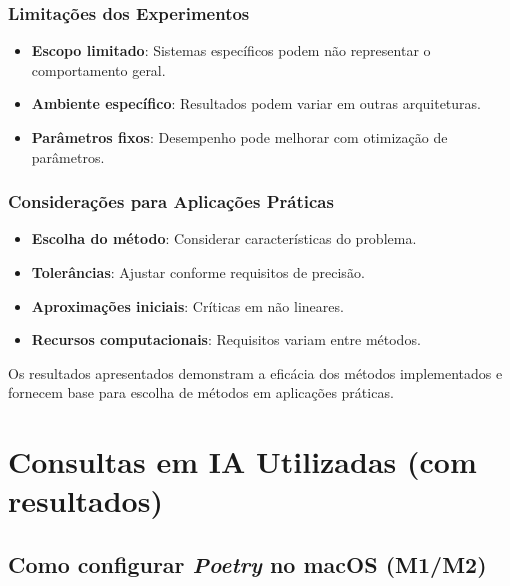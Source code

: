 \documentclass[12pt,a4paper]{article}
\begin{document}
\subsubsection{Limitações dos Experimentos}
\begin{itemize}
    \item \textbf{Escopo limitado}: Sistemas específicos podem não representar o comportamento geral.
    \item \textbf{Ambiente específico}: Resultados podem variar em outras arquiteturas.
    \item \textbf{Parâmetros fixos}: Desempenho pode melhorar com otimização de parâmetros.
\end{itemize}

\subsubsection{Considerações para Aplicações Práticas}
\begin{itemize}
    \item \textbf{Escolha do método}: Considerar características do problema.
    \item \textbf{Tolerâncias}: Ajustar conforme requisitos de precisão.
    \item \textbf{Aproximações iniciais}: Críticas em não lineares.
    \item \textbf{Recursos computacionais}: Requisitos variam entre métodos.
\end{itemize}

\noindent Os resultados apresentados demonstram a eficácia dos métodos implementados e fornecem base para escolha de métodos em aplicações práticas.








\section{Consultas em IA Utilizadas (com resultados)}

\subsection{Como configurar \textit{Poetry} no macOS (M1/M2)}
\end{document}
